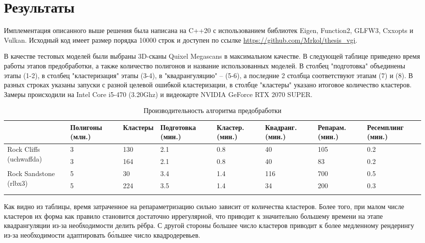 
\section{Результаты}
Имплементация описанного выше решения была написана на C++20 с использованием библиотек Eigen, Function2, GLFW3, Cxxopts и Vulkan. Исходный код имеет размер порядка 10000 строк и доступен по ссылке \url{https://github.com/Mrkol/thesis_vgi}.

В качестве тестовых моделей были выбраны 3D-сканы Quixel Megascans \cite{quixel_megascans} в максимальном качестве. В следующей таблице приведено время работы этапов предобработки, а также количество полигонов и название использованных моделей. В столбец "подготовка" объединены этапы (1-2), в столбец "кластеризация" этапы (3-4), в "квадрангуляцию" -- (5-6), а последние 2 столбца соответствуют этапам (7) и (8). В разных строках указаны запуски с разной целевой ошибкой кластеризации, в столбце "кластеры" указано итоговое количество кластеров. Замеры происходили на Intel Core i5-470 (3.20Ghz) и видеокарте NVIDIA GeForce RTX 2070 SUPER.


\begin{table}[ht]
\small
\centering
\begin{tabular}{ l | p{16mm} | p{15mm} | p{17mm} | p{12mm} | p{14mm} | p{13mm} | p{17mm} }
                        & Полигоны (млн.) & Кластеры & Подготовка (мин.) & Кластер. (мин.) & Квадранг. (мин.) & Репарам. (мин.) & Ресемплинг (мин.) \\
\hline
\multirow{2}{18mm}{Rock Cliffs (uchwaffda)}
& 3    & 130 & 2.1   & 0.8  & 40   & 105    & 0.2   \\
& 3    & 164 & 2.1   & 0.8  & 40   & 83     & 0.2   \\
\hline
\multirow{3}{16mm}{Rock Sandstone (rlbx3)}
& 5    & 30  & 3.4   & 1.4  & 116  & 700    & 0.5   \\
& 5    & 224 & 3.5   & 1.4  & 34   & 200    & 0.3   \\
&&&&&&&\\
\end{tabular}
\caption{Производительность алгоритма предобработки}
\end{table}

Как видно из таблицы, время затраченное на репараметризацию сильно зависит от количества кластеров. Более того, при малом числе кластеров их форма как правило становится достаточно иррегулярной, что приводит к значительно большему времени на этапе квадрангуляции из-за необходимости делить рёбра. С другой стороны большее число кластеров приводит к более медленному рендерингу из-за необходимости адаптировать б\'ольшее число квадродеревьев.

